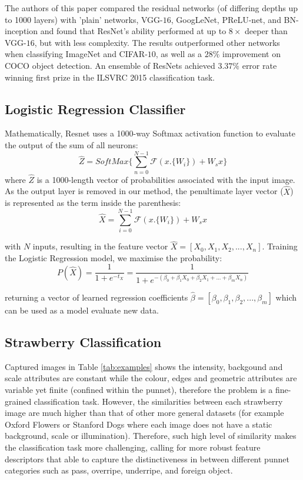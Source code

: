 \documentclass[fleqn,twoside,12pt]{report}
\begin{document}
The authors of this paper \cite{he} compared the residual networks (of differing depths up to 1000 layers) with 'plain' networks, VGG-$16$, GoogLeNet, PReLU-net, and BN-inception and found that ResNet's ability performed at up to $8\times$ deeper than VGG-$16$, but with less complexity. The results outperformed other networks when classifying ImageNet and CIFAR-$10$, as well as a $28\%$ improvement on COCO object detection. An ensemble of ResNets achieved $3.37\%$ error rate winning first prize in the ILSVRC 2015 classification task.


\subsection{Logistic Regression Classifier}


Mathematically, Resnet uses a 1000-way Softmax activation function to evaluate the output of the sum of all neurons:
\begin{equation}
\hat{Z} = SoftMax\Bigg \{ \sum_{n=0}^{N-1} \mathcal{F}(x.\{W_i\}) + W_s x \Bigg \}
\end{equation}
where $\hat{Z}$ is a 1000-length vector of probabilities associated with the input image. As the output layer is removed in our method, the penultimate layer vector ($\hat{X}$) is represented as the term inside the parenthesis:
\begin{equation}
\hat{X} = \sum_{i=0}^{N-1} \mathcal{F}(x.\{W_i\}) + W_s x
\end{equation}

with $N$ inputs, resulting in the feature vector $\hat{X}=[X_0, X_1, X_2,..., X_n]$. Training the Logistic Regression model, we maximise the probability:
\begin{equation}
P(\hat{X}) = \frac{1}{1+e^{-t_X}} 
= \frac{1}{1+e^{-(\beta_0+\beta_1 X_0 + \beta_2         X_1+...+\beta_m X_n)}}
\end{equation}

returning a vector of learned regression coefficients $\hat{\beta}=[\beta_0, \beta_1, \beta_2,...,\beta_m]$ which can be used as a model evaluate new data. 



\subsection{Strawberry Classification}
\label{sec:strawberry_classification}

Captured images in Table \ref{tab:examples} shows the intensity, backgound and scale attributes are constant while the colour, edges and geometric attributes are variable yet finite (confined within the punnet), therefore the problem is a fine-grained classification task. However, the similarities between each strawberry image are much higher than that of other more general datasets (for example Oxford Flowers or Stanford Dogs where each image does not have a static background, scale or illumination). Therefore, such high level of similarity makes the classification task more challenging, calling for more robust feature descriptors that able to capture the distinctiveness in between different punnet categories such as pass, overripe, underripe, and foreign object.
\end{document}
